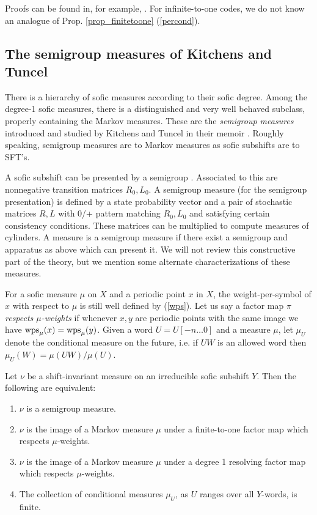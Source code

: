 \documentclass{kepart2010}
\theoremstyle{plain}
\theoremstyle{definition}
\theoremstyle{remark}
\theoremstyle{definition}
\numberwithin{equation}{section}
\begin{document}
Proofs can be found in, for example, \cite{Kitchens1982}. For
infinite-to-one codes, we do not know an analogue of Prop.
\ref{prop_finitetoone} (\ref{percond}).

\subsection{The semigroup measures of Kitchens and Tuncel}\label{semigroup}

{There is}
 a hierarchy of sofic
measures according to their sofic degree. Among the degree-1 sofic
measures, there is a distinguished and very well behaved subclass,
properly containing the Markov measures. These are the {\em
semigroup measures} introduced and studied by Kitchens and Tuncel in
their memoir \cite{KitchensTuncel1985}.
Roughly speaking,  semigroup measures are to Markov measures as
sofic subshifts are to SFT's.

A sofic subshift can be presented by a semigroup \cite{Weiss1973,
KitchensTuncel1985}. Associated to this are nonnegative transition
matrices $R_0,L_0$. A semigroup measure (for the semigroup
presentation) is defined by
 a state probability vector and
a pair of stochastic matrices $R,L$ with 0/+ pattern matching
$R_0,L_0$ and satisfying certain consistency conditions.
 These matrices can be multiplied to compute measures of cylinders. A
measure is a semigroup measure if there exist a semigroup and
apparatus as above which can present it.
 We will not review this constructive part of the theory, but
 we mention some alternate characterizations of these
measures.

For a sofic measure $\mu$ on $X$ and a periodic point $x$
in $X$, the weight-per-symbol of $x$ with respect to
$\mu$ is still well defined by (\ref{wps}).
Let us say a factor map
$\pi$ {\em respects $\mu$-weights}
 if whenever $x,y$ are periodic points with the same image
we have $\textnormal{wps}_{\mu}(x)=\textnormal{wps}_{\mu}(y)$. Given
a word $U=U[-n\dots 0]$ and a measure $\mu$, let $\mu_U$ denote the
conditional measure on the future, i.e. if $UW$ is an allowed word
then $\mu_U (W)= \mu( UW)/\mu (U)$.

\begin{thm}\cite{KitchensTuncel1985}
Let $\nu$ be a shift-invariant measure on an irreducible sofic
subshift $Y$. Then the following are equivalent:
\begin{enumerate}
\item
$\nu$ is a semigroup measure.
\item
$\nu$ is the image of a Markov measure $\mu$ under a finite-to-one
factor map which respects $\mu$-weights.
\item
$\nu$ is the image of a Markov measure $\mu$
under a degree 1 resolving factor map which respects
$\mu$-weights.
\item
The collection of conditional measures $\mu_U$, as
$U$ ranges over all $Y$-words, is finite.
\end{enumerate}
\end{thm}
\end{document}
